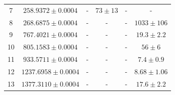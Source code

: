 \begin{table}[h!]
\begin{adjustbox}{width=1.3\textwidth, center}
\begin{tabular}{S[table-format=2.0] S[table-format=4.4] S[table-format=6.4] S[table-format=2.4] S S[table-format=4.4]}
			7                & {$258.9372 \pm 0.0004$}                   & {-}                                        & {$73 \pm 13$}                                 & {-}                                         & {-}                                         \\
			8                & {$268.6875 \pm 0.0004$}                   & {-}                                        & {-}                                         & {-}                                         & {$1033 \pm 106$}                    \\
			9                & {$767.4021 \pm 0.0004$}                   & {-}                                        & {-}                                         & {-}                                         & {$19.3 \pm 2.2$}                        \\
			10               & {$805.1583 \pm 0.0004$}                   & {-}                                        & {-}                                         & {-}                                         & {$56 \pm 6$}                        \\
			11               & {$933.5711 \pm 0.0004$}                   & {-}                                        & {-}                                         & {-}                                         & {$7.4 \pm 0.9$}                         \\
			12               & {$1237.6958 \pm 0.0004$}                  & {-}                                        & {-}                                         & {-}                                         & {$8.68 \pm 1.06$}                         \\
			13               & {$1377.3110 \pm 0.0004$}                  & {-}                                        & {-}                                         & {-}                                         & {$17.6 \pm 2.2$}                        \\
			\bottomrule
		\end{tabular}
	\end{adjustbox}
\end{table}
\noindent